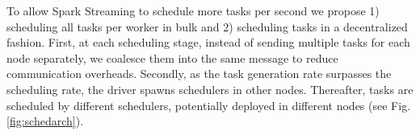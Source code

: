 To allow Spark Streaming to schedule more tasks per second we propose 1) scheduling all tasks per worker in bulk and 2) scheduling tasks in a decentralized fashion.
First, at each scheduling stage, instead of sending multiple tasks for each node separately, we coalesce them into the same message to reduce communication overheads.
Secondly, as the task generation rate surpasses the scheduling rate, the driver spawns schedulers in other nodes. Thereafter, tasks are scheduled by different schedulers, potentially deployed in different nodes (see Fig. \ref{fig:schedarch}).

